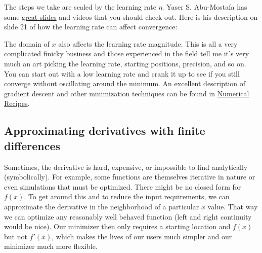 \documentclass[titlepage]{tufte-book}
\begin{document}
\begin{fullwidth}
The steps we take are scaled by the learning rate $\eta$.  Yaser S. Abu-Mostafa has some \href{http://www.amlbook.com/slides/iTunesU_Lecture09_May_01.pdf}{great slides} and videos that you should check out. Here is his description on slide 21 of how the learning rate can affect convergence:


The domain of $x$ also affects the learning rate magnitude. This is all a very complicated finicky business and those experienced in the field tell me it's very much an art picking the learning rate, starting positions, precision, and so on. You can start out with a low learning rate and crank it up to see if you still converge without oscillating around the minimum.  \noindent An excellent description of gradient descent and other minimization techniques can be found in \href{http://apps.nrbook.com/fortran/index.html}{Numerical Recipes}.

\subsection{Approximating derivatives with finite differences}

Sometimes, the derivative is hard, expensive, or impossible to find analytically (symbolically).  For example, some functions are themselves iterative in nature or even simulations that must be optimized. There might be no closed form for $f(x)$. To get around this and to reduce the input requirements, we can approximate the derivative in the neighborhood of a particular $x$ value. That way we can optimize any reasonably well behaved function (left and right continuity would be nice). Our minimizer then only requires a starting location and $f(x)$ but not $f'(x)$, which makes the lives of our users much simpler and our minimizer much more flexible. 


\end{fullwidth}
\end{document}
